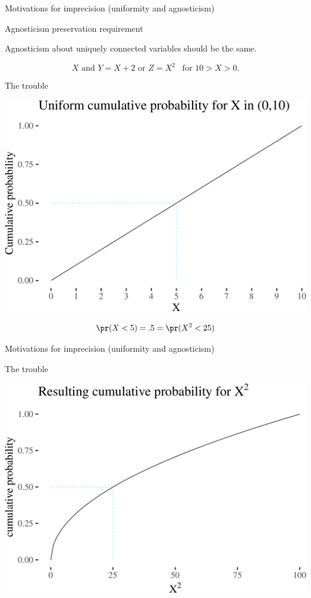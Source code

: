 \documentclass[10pt,ignorenonframetext,x11names, dvipsnames, bibspacing,natbib]{beamer}
\begin{document}
\begin{frame}{Motivations for imprecision \large (uniformity and
agnosticism)}

\begin{block}{Agnosticism preservation requirement}

Agnosticism about uniquely connected variables should be the same.

\vspace{-5mm}

\[X \mbox{ and } Y=X+2 \mbox{ or } Z = X^2 \,\,\, \mbox{ for $10>X>0$.}\]

\pause

\end{block}

\begin{block}{The trouble}

\begin{center}\includegraphics[width=0.6\linewidth]{presentationESSLLI_files/figure-beamer/unnamed-chunk-2-1} \end{center}

\vspace{-9mm}

\begin{align*}\pr(X<5) = .5 = \pr(X^2 < 25)
\end{align*}

\end{block}

\end{frame}

\begin{frame}{Motivations for imprecision \large (uniformity and
agnosticism)}

\begin{block}{The trouble}

\begin{center}\includegraphics[width=0.6\linewidth]{presentationESSLLI_files/figure-beamer/unnamed-chunk-3-1} \end{center}

\end{block}

\end{frame}
\end{document}
